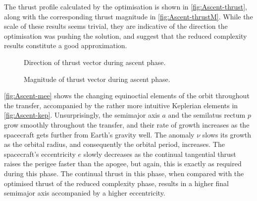 %
%

The thrust profile calculated by the optimisation is shown in \autoref{fig:Ascent-thrust}, along with the corresponding thrust magnitude in \autoref{fig:Ascent-thrustM}. While the scale of these results seems trivial, they are indicative of the direction the optimisation was pushing the solution, and suggest that the reduced complexity results constitute a good approximation. 

\begin{figure}
\centering
\def\svgwidth{\figurewidth}

\caption{Direction of thrust vector during ascent phase.} \label{fig:Ascent-thrust}
\end{figure}

\begin{figure}
\centering
\def\svgwidth{\figurewidth}

\caption{Magnitude of thrust vector during ascent phase.} \label{fig:Ascent-thrustM}
\end{figure}

\autoref{fig:Ascent-mee} shows the changing equinoctial elements of the orbit throughout the transfer, accompanied by the rather more intuitive Keplerian elements in \autoref{fig:Ascent-kep}. Unsurprisingly, the semimajor axis $a$ and the semilatus rectum $p$ grow smoothly throughout the transfer, and their rate of growth increases as the spacecraft gets further from Earth's gravity well. The anomaly $\nu$ slows its growth as the orbital radius, and consequently the orbital period, increases. The spacecraft's eccentricity $e$ slowly decreases as the continual tangential thrust raises the perigee faster than the apogee, but again, this is exactly as required during this phase. The continual thrust in this phase, when compared with the optimised thrust of the reduced complexity phase, results in a higher final semimajor axis accompanied by a higher eccentricity.

